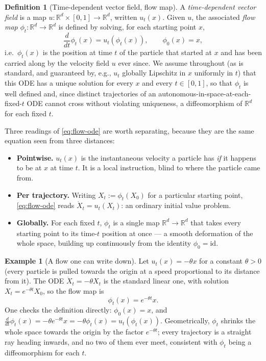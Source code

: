 \documentclass[11pt,a4paper]{report}
\theoremstyle{definition}
\newtheorem{definition}[definition]{Definition}
\newtheorem{example}[example]{Example}
\theoremstyle{remark}
\newcommand{\RR}{\mathbb R}
\begin{document}
\begin{definition}[Time-dependent vector field, flow map]
\label{def:vector-field-flow}
A \emph{time-dependent vector field} is a map $u:\RR^d\times[0,1]\to\RR^d$,
written $u_t(x)$. Given $u$, the associated \emph{flow map}
$\phi_t:\RR^d\to\RR^d$ is defined by solving, for each starting point $x$,
\begin{equation}
\label{eq:flow-ode}
\frac{d}{dt}\phi_t(x) = u_t(\phi_t(x)),
\qquad
\phi_0(x)=x ,
\end{equation}
i.e.\ $\phi_t(x)$ is the position at time $t$ of the particle that started
at $x$ and has been carried along by the velocity field $u$ ever since. We
assume throughout (as is standard, and guaranteed by, e.g., $u_t$ globally
Lipschitz in $x$ uniformly in $t$) that this ODE has a unique solution for
every $x$ and every $t\in[0,1]$, so that $\phi_t$ is well defined and, since
distinct trajectories of an autonomous-in-space-at-each-fixed-$t$ ODE
cannot cross without violating uniqueness, a diffeomorphism of $\RR^d$ for
each fixed $t$.
\end{definition}

Three readings of \eqref{eq:flow-ode} are worth separating, because they are
the same equation seen from three distances:

\begin{itemize}
\item \textbf{Pointwise.} $u_t(x)$ is the instantaneous velocity a particle
      has \emph{if} it happens to be at $x$ at time $t$. It is a local
      instruction, blind to where the particle came from.
\item \textbf{Per trajectory.} Writing $X_t := \phi_t(X_0)$ for a
      particular starting point, \eqref{eq:flow-ode} reads
      $\dot X_t = u_t(X_t)$: an ordinary initial value problem.
\item \textbf{Globally.} For each fixed $t$, $\phi_t$ is a single map
      $\RR^d\to\RR^d$ that takes every starting point to its
      time-$t$ position at once --- a smooth deformation of the whole space,
      building up continuously from the identity $\phi_0=\mathrm{id}$.
\end{itemize}

\begin{example}[A flow one can write down]
\label{ex:linear-flow}
Let $u_t(x) = -\theta x$ for a constant $\theta>0$ (every particle is
pulled towards the origin at a speed proportional to its distance from it).
The ODE $\dot X_t = -\theta X_t$ is the standard linear one, with solution
$X_t = e^{-\theta t}X_0$, so the flow map is
\[
\phi_t(x) = e^{-\theta t}x .
\]
One checks the definition directly: $\phi_0(x)=x$, and
$\frac{d}{dt}\phi_t(x) = -\theta e^{-\theta t}x = -\theta\phi_t(x) = u_t(\phi_t(x))$.
Geometrically, $\phi_t$ shrinks the whole space towards the origin by the
factor $e^{-\theta t}$; every trajectory is a straight ray heading inwards,
and no two of them ever meet, consistent with $\phi_t$ being a
diffeomorphism for each $t$.
\end{example}
\end{document}
